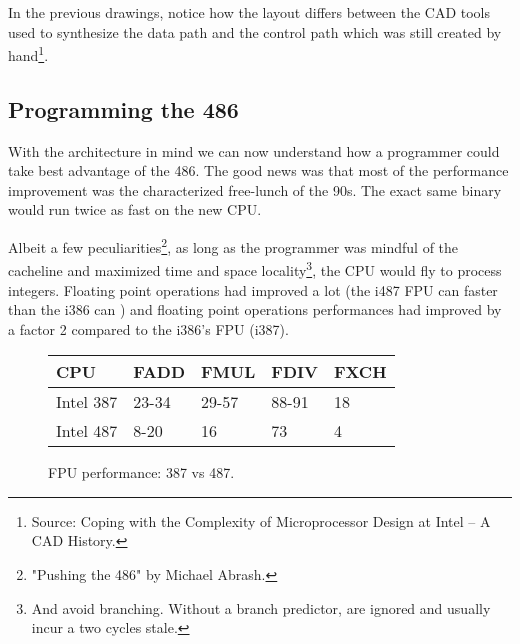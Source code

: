 \par



\begin{figure}[H]
\centering
{}
\end{figure}
\par
\begin{figure}[H]
\centering
{}
\end{figure}





In the previous drawings, notice how the layout differs between the CAD tools used to synthesize the data path and the control path which was still created by hand\footnote{Source: Coping with the Complexity of Microprocessor
Design at Intel -- A CAD History.}.\\
\par
\subsection{Programming the 486}
With the architecture in mind we can now understand how a programmer could take best advantage of the 486. The good news was that most of the performance improvement was the characterized free-lunch of the 90s. The exact same binary would run twice as fast on the new CPU.\\
\par
Albeit a few peculiarities\footnote{"Pushing the 486" by Michael Abrash.}, as long as the programmer was mindful of the cacheline and maximized time and space locality\footnote{And avoid branching. Without a branch predictor,  are ignored and usually incur a two cycles stale.}, the CPU would fly to process integers. Floating point operations had improved a lot (the i487 FPU can  faster than the i386 can ) and floating point operations performances had improved by a factor 2 compared to the i386's FPU (i387).\\
\par
\begin{figure}[H]
\centering
\begin{tabularx}{\textwidth}{ X  X X  X  X}
  \toprule
  \textbf{CPU} & \textbf{FADD} & \textbf{FMUL} & \textbf{FDIV} &\textbf{FXCH} \\ \bottomrule
Intel 387 & 23-34 & 29-57   & 88-91 & 18 \\
Intel 487 & 8-20  & 16   & 73 & 4 \\ \bottomrule
\end{tabularx}
\caption{FPU performance: 387 vs 487.}

\end{figure}

